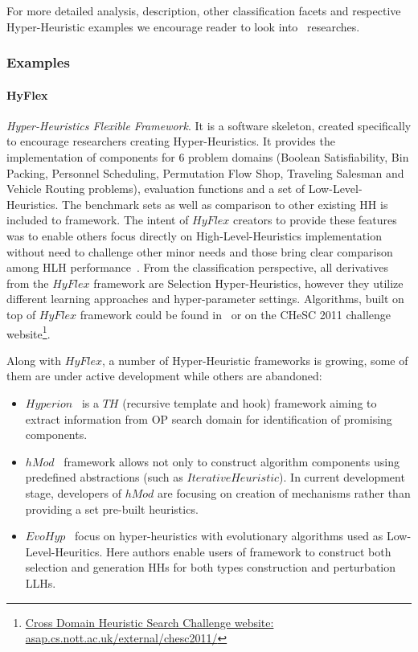 For more detailed analysis, description, other classification facets and respective Hyper-Heuristic examples we encourage reader to look into~\cite{burke2003hyper,ryser2014review,drake2019recent,burke2019classification} researches.

\subsubsection{Examples}\label{bg: hh examples}%
\paragraph{HyFlex~\cite{ochoa2012hyflex}}\textit{Hyper-Heuristics Flexible Framework}. It is a software skeleton, created specifically to encourage researchers creating Hyper-Heuristics. It provides the implementation of components for 6 problem domains (Boolean Satisfiability, Bin Packing, Personnel Scheduling, Permutation Flow Shop, Traveling Salesman and Vehicle Routing problems), evaluation functions and a set of Low-Level-Heuristics. The benchmark sets as well as comparison to other existing HH is included to framework. The intent of $HyFlex$ creators to provide these features was to enable others focus directly on High-Level-Heuristics implementation without need to challenge other minor needs and those bring clear comparison among HLH performance~\cite{ochoa2012hyflex}. From the classification perspective, all derivatives from the $HyFlex$ framework are Selection Hyper-Heuristics, however they utilize different learning approaches and hyper-parameter settings. Algorithms, built on top of $HyFlex$ framework could be found in~\cite{misir2012intelligent,ryser2014review,drake2019recent} or on the CHeSC 2011 challenge website\footnote[1]{\href{http://www.asap.cs.nott.ac.uk/external/chesc2011/}{Cross Domain Heuristic Search Challenge website: asap.cs.nott.ac.uk/external/chesc2011/}}.


Along with $HyFlex$, a number of Hyper-Heuristic frameworks is growing, some of them are under active development while others are abandoned:
\begin{itemize}
	\item $Hyperion$~\cite{swan2011hyperion} is a $TH$ (recursive template and hook) framework aiming to extract information from OP search domain for identification of promising components.
	
	\item $hMod$~\cite{urra2013hMod} framework allows not only to construct algorithm components using predefined abstractions (such as $IterativeHeuristic$). In current development stage, developers of $hMod$ are focusing on creation of mechanisms rather than providing a set pre-built heuristics. 
	
	\item $EvoHyp$~\cite{pillay2017evohyp} focus on hyper-heuristics with evolutionary algorithms used as Low-Level-Heuritics. Here authors enable users of framework to construct both selection and generation HHs for both types construction and perturbation LLHs.
	
\end{itemize} 

